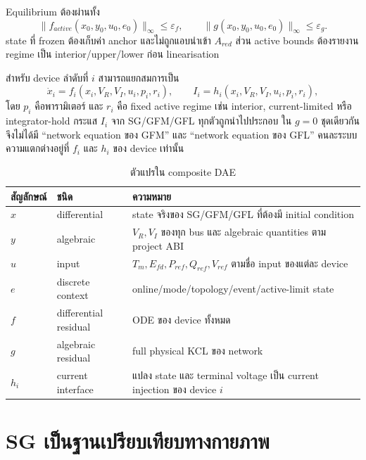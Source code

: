 \documentclass[12pt,a4paper]{article}
\begin{document}
Equilibrium ต้องผ่านทั้ง
\begin{equation}
\|f_{active}(x_0,y_0,u_0,e_0)\|_\infty\le\varepsilon_f,
\qquad
\|g(x_0,y_0,u_0,e_0)\|_\infty\le\varepsilon_g.
\end{equation}
state ที่ frozen ต้องเก็บค่า anchor และไม่ถูกแอบนำเข้า $A_{red}$ ส่วน active bounds
ต้องรายงาน regime เป็น interior/upper/lower ก่อน linearisation

สำหรับ device ลำดับที่ $i$ สามารถแยกสมการเป็น
\begin{equation}
\dot x_i=f_i(x_i,V_R,V_I,u_i,p_i,r_i),\qquad
I_i=h_i(x_i,V_R,V_I,u_i,p_i,r_i),
\label{eq:device-dae}
\end{equation}
โดย $p_i$ คือพารามิเตอร์ และ $r_i$ คือ fixed active regime เช่น interior,
current-limited หรือ integrator-hold กระแส $I_i$ จาก SG/GFM/GFL ทุกตัวถูกนำไปประกอบ
ใน $g=0$ ชุดเดียวกัน จึงไม่ได้มี ``network equation ของ GFM'' และ ``network equation
ของ GFL'' คนละระบบ ความแตกต่างอยู่ที่ $f_i$ และ $h_i$ ของ device เท่านั้น

\begin{table}[H]\centering
\caption{ตัวแปรใน composite DAE}\label{tab:dae-symbols}
\begin{tabularx}{\textwidth}{p{}p{}X}
\toprule
สัญลักษณ์ & ชนิด & ความหมาย \\ \midrule
$x$ & differential & state จริงของ SG/GFM/GFL ที่ต้องมี initial condition \\
$y$ & algebraic & $V_R,V_I$ ของทุก bus และ algebraic quantities ตาม project ABI \\
$u$ & input & $T_m,E_{fd},P_{ref},Q_{ref},V_{ref}$ ตามชื่อ input ของแต่ละ device \\
$e$ & discrete context & online/mode/topology/event/active-limit state \\
$f$ & differential residual & ODE ของ device ทั้งหมด \\
$g$ & algebraic residual & full physical KCL ของ network \\
$h_i$ & current interface & แปลง state และ terminal voltage เป็น current injection ของ device $i$ \\
\bottomrule
\end{tabularx}
\end{table}

\section{SG เป็นฐานเปรียบเทียบทางกายภาพ}
\end{document}
